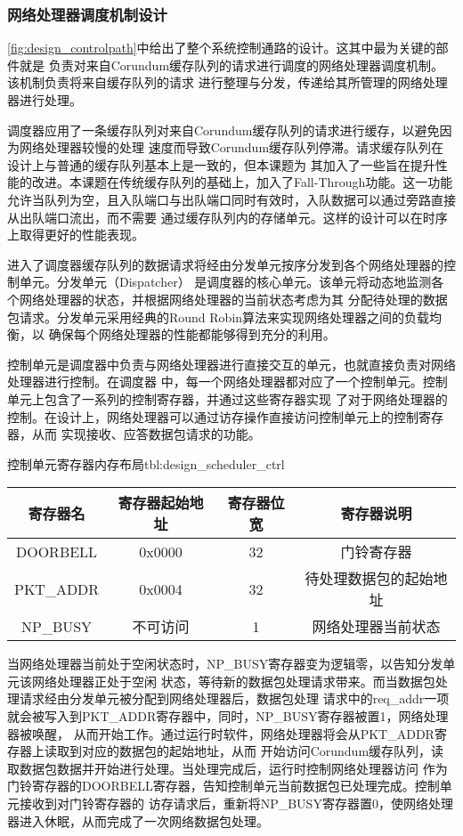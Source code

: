 \subsubsection{网络处理器调度机制设计}

\autoref{fig:design_controlpath}中给出了整个系统控制通路的设计。这其中最为关键的部件就是
负责对来自Corundum缓存队列的请求进行调度的网络处理器调度机制。该机制负责将来自缓存队列的请求
进行整理与分发，传递给其所管理的网络处理器进行处理。

调度器应用了一条缓存队列对来自Corundum缓存队列的请求进行缓存，以避免因为网络处理器较慢的处理
速度而导致Corundum缓存队列停滞。请求缓存队列在设计上与普通的缓存队列基本上是一致的，但本课题为
其加入了一些旨在提升性能的改进。本课题在传统缓存队列的基础上，加入了Fall-Through功能。这一功能
允许当队列为空，且入队端口与出队端口同时有效时，入队数据可以通过旁路直接从出队端口流出，而不需要
通过缓存队列内的存储单元。这样的设计可以在时序上取得更好的性能表现。

进入了调度器缓存队列的数据请求将经由分发单元按序分发到各个网络处理器的控制单元。分发单元（Dispatcher）
是调度器的核心单元。该单元将动态地监测各个网络处理器的状态，并根据网络处理器的当前状态考虑为其
分配待处理的数据包请求。分发单元采用经典的Round Robin算法来实现网络处理器之间的负载均衡，以
确保每个网络处理器的性能都能够得到充分的利用。

控制单元是调度器中负责与网络处理器进行直接交互的单元，也就直接负责对网络处理器进行控制。在调度器
中，每一个网络处理器都对应了一个控制单元。控制单元上包含了一系列的控制寄存器，并通过这些寄存器实现
了对于网络处理器的控制。在设计上，网络处理器可以通过访存操作直接访问控制单元上的控制寄存器，从而
实现接收、应答数据包请求的功能。

\begin{generaltab}{控制单元寄存器内存布局}{tbl:design_scheduler_ctrl}
  \begin{tabular}{cccc}
    \toprule
    寄存器名 & 寄存器起始地址 & 寄存器位宽 & 寄存器说明 \\
    \midrule
    DOORBELL & 0x0000 & 32 & 门铃寄存器 \\
    PKT\_ADDR & 0x0004 & 32 & 待处理数据包的起始地址 \\
    \midrule
    NP\_BUSY & 不可访问 & 1 & 网络处理器当前状态 \\
    \bottomrule
  \end{tabular}
\end{generaltab}

当网络处理器当前处于空闲状态时，NP\_BUSY寄存器变为逻辑零，以告知分发单元该网络处理器正处于空闲
状态，等待新的数据包处理请求带来。而当数据包处理请求经由分发单元被分配到网络处理器后，数据包处理
请求中的req\_addr一项就会被写入到PKT\_ADDR寄存器中，同时，NP\_BUSY寄存器被置1，网络处理器被唤醒，
从而开始工作。通过运行时软件，网络处理器将会从PKT\_ADDR寄存器上读取到对应的数据包的起始地址，从而
开始访问Corundum缓存队列，读取数据包数据并开始进行处理。当处理完成后，运行时控制网络处理器访问
作为门铃寄存器的DOORBELL寄存器，告知控制单元当前数据包已处理完成。控制单元接收到对门铃寄存器的
访存请求后，重新将NP\_BUSY寄存器置0，使网络处理器进入休眠，从而完成了一次网络数据包处理。

